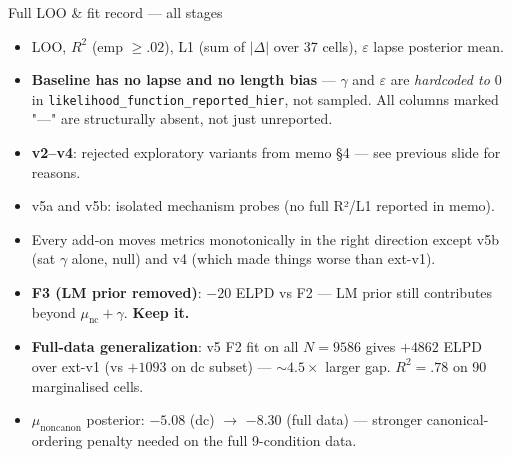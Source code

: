 \documentclass[10pt,aspectratio=169]{beamer}
\newcommand{\main}[1]{\textcolor{CSP-main-dark}{\textbf{#1}}}
\newcommand{\emp}[1]{\textcolor{CSP-emphasis}{\textbf{#1}}}
\begin{document}
\begin{frame}{Full LOO \& fit record --- all stages}
\vspace{0.6em}
\begin{itemize}\itemsep0.15em
  \item LOO, $R^2$ (emp $\geq .02$), L1 (sum of $|\Delta|$ over 37 cells), $\varepsilon$ lapse posterior mean.
  \item \main{Baseline has no lapse and no length bias} --- $\gamma$ and $\varepsilon$ are \emph{hardcoded to $0$} in \texttt{likelihood\_function\_reported\_hier}, not sampled. All columns marked "---" are structurally absent, not just unreported.
  \item \emp{v2--v4}: rejected exploratory variants from memo \S4 --- see previous slide for reasons.
  \item v5a and v5b: isolated mechanism probes (no full R²/L1 reported in memo).
  \item Every add-on moves metrics monotonically in the right direction except v5b (sat $\gamma$ alone, null) and v4 (which made things worse than ext-v1).
  \item \main{F3 (LM prior removed)}: $-20$ ELPD vs F2 --- LM prior still contributes beyond $\mu_\mathrm{nc} + \gamma$. \emp{Keep it.}
  \item \main{Full-data generalization}: v5 F2 fit on all $N=9586$ gives $+4862$ ELPD over ext-v1 (vs $+1093$ on dc subset) --- $\sim\!4.5\times$ larger gap. $R^2 = .78$ on 90 marginalised cells.
  \item $\mu_\mathrm{noncanon}$ posterior: $-5.08$ (dc) $\to$ $-8.30$ (full data) --- stronger canonical-ordering penalty needed on the full 9-condition data.
\end{itemize}
\end{frame}
\end{document}
